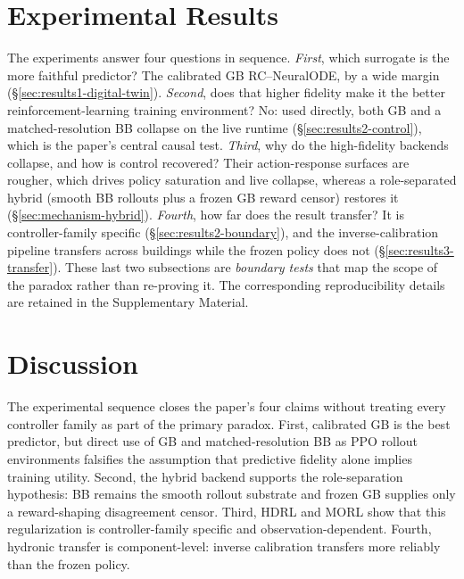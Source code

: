 \section{Experimental Results}\label{sec:experimental}
The experiments answer four questions in sequence. \emph{First}, which surrogate is the more faithful predictor? The calibrated GB RC--NeuralODE, by a wide margin (\S\ref{sec:results1-digital-twin}). \emph{Second}, does that higher fidelity make it the better reinforcement-learning training environment? No: used directly, both GB and a matched-resolution BB collapse on the live runtime (\S\ref{sec:results2-control}), which is the paper's central causal test. \emph{Third}, why do the high-fidelity backends collapse, and how is control recovered? Their action-response surfaces are rougher, which drives policy saturation and live collapse, whereas a role-separated hybrid (smooth BB rollouts plus a frozen GB reward censor) restores it (\S\ref{sec:mechanism-hybrid}). \emph{Fourth}, how far does the result transfer? It is controller-family specific (\S\ref{sec:results2-boundary}), and the inverse-calibration pipeline transfers across buildings while the frozen policy does not (\S\ref{sec:results3-transfer}). These last two subsections are \emph{boundary tests} that map the scope of the paradox rather than re-proving it. The corresponding reproducibility details are retained in the Supplementary Material.





\section{Discussion}\label{sec:discussion}

The experimental sequence closes the paper's four claims without treating every controller family as part of the primary paradox. First, calibrated GB is the best predictor, but direct use of GB and matched-resolution BB as PPO rollout environments falsifies the assumption that predictive fidelity alone implies training utility. Second, the hybrid backend supports the role-separation hypothesis: BB remains the smooth rollout substrate and frozen GB supplies only a reward-shaping disagreement censor. Third, HDRL and MORL show that this regularization is controller-family specific and observation-dependent. Fourth, hydronic transfer is component-level: inverse calibration transfers more reliably than the frozen policy.

